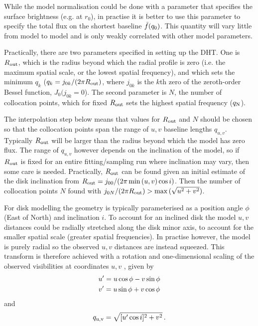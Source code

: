 \documentclass[fleqn,usenatbib]{mnras}
\begin{document}
While the model normalisation could be done with a parameter that specifies the surface brightness (e.g. at $r_0$), in practise it is better to use this parameter to specify the total flux on the shortest baseline $\Tilde{f}(q_0)$. This quantity will vary little from model to model and is only weakly correlated with other model parameters.

Practically, there are two parameters specified in setting up the DHT. One is $R_{\rm out}$, which is the radius beyond which the radial profile is zero (i.e. the maximum spatial scale, or the lowest spatial frequency), and which sets the minimum $q_k$ ($q_k = j_{0k}/(2 \pi R_{\rm out})$, where $j_{0k}$ is the $k$th zero of the zeroth-order Bessel function, $J_0(j_{0k}=0$). The second parameter is $N$, the number of collocation points, which for fixed $R_{\rm out}$ sets the highest spatial frequency ($q_{\rm N}$). 

The interpolation step below means that values for $R_{\rm out}$ and $N$ should be chosen so that the collocation points span the range of $u,v$ baseline lengths $q_{u,v}$. Typically $R_{\rm out}$ will be larger than the radius beyond which the model has zero flux. The range of $q_{u,v}$ however depends on the inclination of the model, so if $R_{\rm out}$ is fixed for an entire fitting/sampling run where inclination may vary, then some care is needed. Practically, $R_{\rm out}$ can be found given an initial estimate of the disk inclination from $R_{\rm out} = j_{00}/(2 \pi \min{(u,v)} \cos i)$. Then the number of collocation points $N$ found with $j_{0N}/(2 \pi R_{\rm out}) > \max{(\sqrt{u^2+v^2})}$.

For disk modelling the geometry is typically parameterised as a position angle $\phi$ (East of North) and inclination $i$. To account for an inclined disk the model $u,v$ distances could be radially stretched along the disk minor axis, to account for the smaller spatial scale (greater spatial frequencies). In practise however, the model is purely radial so the observed $u,v$ distances are instead squeezed. This transform is therefore achieved with a rotation and one-dimensional scaling of the observed visibilities at coordinates $u,v$ \citep[e.g. as in][]{2018MNRAS.476.4527T}, given by
\begin{gather}
    u' = u \cos \phi - v \sin \phi \notag \\
    v' = u \sin \phi + v \cos \phi
\end{gather}
and 
\begin{equation}
    q_{\rm u,v} = \sqrt{[u' \cos i]^2 + v^2} \, .
\end{equation}
\end{document}
